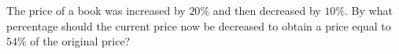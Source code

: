 The price of a book was increased by $20\%$ and then decreased by $10\%$. By what percentage should the current price now be decreased to obtain a price equal to $54\%$ of the original price?
